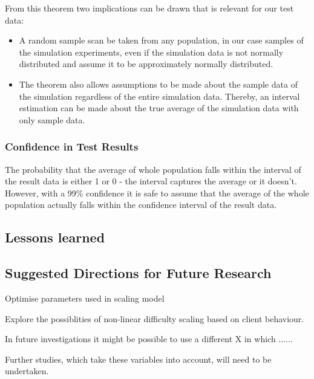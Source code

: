 From this theorem two implications can be drawn that is relevant for our test data:
\begin{itemize}
\item A random sample scan be taken from any population, in our case samples of the simulation experiments, even if the simulation data is not normally distributed and assume it to be approximately normally distributed.

\item The theorem also allows assumptions to be made about the sample data of the simulation regardless of the entire simulation data. Thereby, an interval estimation can be made about the true average of the simulation data with only sample data.
\end{itemize}

 \subsubsection{Confidence in Test Results}
The probability that the average of whole population falls within the interval of the result data is either 1 or 0 - the interval captures the average or it doesn't\cite{gunnar}. However, with a 99\% confidence it is safe to assume that the average of the whole population actually falls within the confidence interval of the result data. 


\subsection{Lessons learned}
\subsection{Suggested Directions for Future Research}

Optimise parameters used in scaling model

Explore the possiblities of non-linear difficulty scaling based on client behaviour. 

In future investigations it might be possible to use a different X in which ...... 

Further studies, which take these variables into account, will need to be undertaken.
